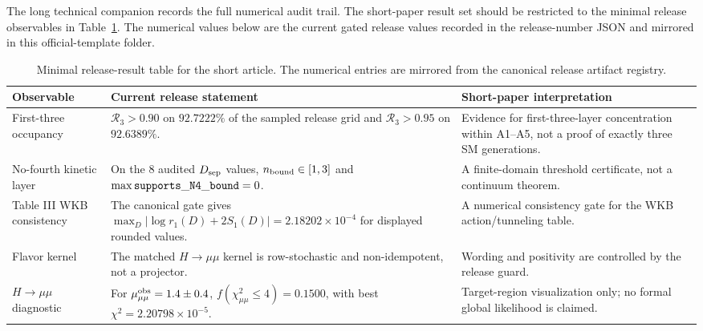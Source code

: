 \documentclass[pdflatex,sn-mathphys-num,iicol]{sn-jnl}
\newcommand{\Rthree}{\mathcal{R}_3}
\newcommand{\ReleaseRthreeGTNinety}{92.7222\%}
\newcommand{\ReleaseRthreeGTNinetyFive}{92.6389\%}
\newcommand{\ReleaseHmumuChiTwoLeFour}{0.1500}
\newcommand{\ReleaseHmumuBestChiTwo}{2.20798\times 10^{-5}}
\newcommand{\ReleaseHighNDCount}{8}
\newcommand{\ReleaseHighNBoundMin}{1}
\newcommand{\ReleaseHighNBoundMax}{3}
\newcommand{\ReleaseHighNSupportsNFourMax}{0}
\newcommand{\ReleaseTableIIIResidual}{2.18202\times 10^{-4}}
\begin{document}
The long technical companion records the full numerical audit trail.
The short-paper result set should be restricted to the minimal release observables in Table~\ref{tab:release_results}.
The numerical values below are the current gated release values recorded in the release-number JSON and mirrored in this official-template folder.
\begin{table}[t]
\centering
\caption{Minimal release-result table for the short article.  The numerical entries are mirrored from the canonical release artifact registry.}
\label{tab:release_results}
\small
\setlength{\tabcolsep}{4pt}
\renewcommand{\arraystretch}{1.12}
\begin{tabular}{@{}l l l@{}}
\toprule
\parbox[t]{0.20\textwidth}{\raggedright \textbf{Observable}} & \parbox[t]{0.34\textwidth}{\raggedright \textbf{Current release statement}} & \parbox[t]{0.33\textwidth}{\raggedright \textbf{Short-paper interpretation}} \\
\midrule
\parbox[t]{0.20\textwidth}{\raggedright First-three occupancy} & \parbox[t]{0.34\textwidth}{\raggedright \(\Rthree>0.90\) on \(\ReleaseRthreeGTNinety\) of the sampled release grid and \(\Rthree>0.95\) on \(\ReleaseRthreeGTNinetyFive\).} & \parbox[t]{0.33\textwidth}{\raggedright Evidence for first-three-layer concentration within A1--A5, not a proof of exactly three SM generations.} \\
\parbox[t]{0.20\textwidth}{\raggedright No-fourth kinetic layer} & \parbox[t]{0.34\textwidth}{\raggedright On the \(\ReleaseHighNDCount\) audited \(D_{\rm sep}\) values, \(n_{\rm bound}\in[\ReleaseHighNBoundMin,\ReleaseHighNBoundMax]\) and \(\max {\tt supports\_N4\_bound}=\ReleaseHighNSupportsNFourMax\).} & \parbox[t]{0.33\textwidth}{\raggedright A finite-domain threshold certificate, not a continuum theorem.} \\
\parbox[t]{0.20\textwidth}{\raggedright Table III WKB consistency} & \parbox[t]{0.34\textwidth}{\raggedright The canonical gate gives \(\max_D |\log r_1(D)+2S_1(D)|=\ReleaseTableIIIResidual\) for displayed rounded values.} & \parbox[t]{0.33\textwidth}{\raggedright A numerical consistency gate for the WKB action/tunneling table.} \\
\parbox[t]{0.20\textwidth}{\raggedright Flavor kernel} & \parbox[t]{0.34\textwidth}{\raggedright The matched \(H\to\mu\mu\) kernel is row-stochastic and non-idempotent, not a projector.} & \parbox[t]{0.33\textwidth}{\raggedright Wording and positivity are controlled by the release guard.} \\
\parbox[t]{0.20\textwidth}{\raggedright \(H\to\mu\mu\) diagnostic} & \parbox[t]{0.34\textwidth}{\raggedright For \(\mu_{\mu\mu}^{\rm obs}=1.4\pm0.4\), \(f(\chi^2_{\mu\mu}\le4)=\ReleaseHmumuChiTwoLeFour\), with best \(\chi^2=\ReleaseHmumuBestChiTwo\).} & \parbox[t]{0.33\textwidth}{\raggedright Target-region visualization only; no formal global likelihood is claimed.} \\
\bottomrule
\end{tabular}
\end{table}
\end{document}
